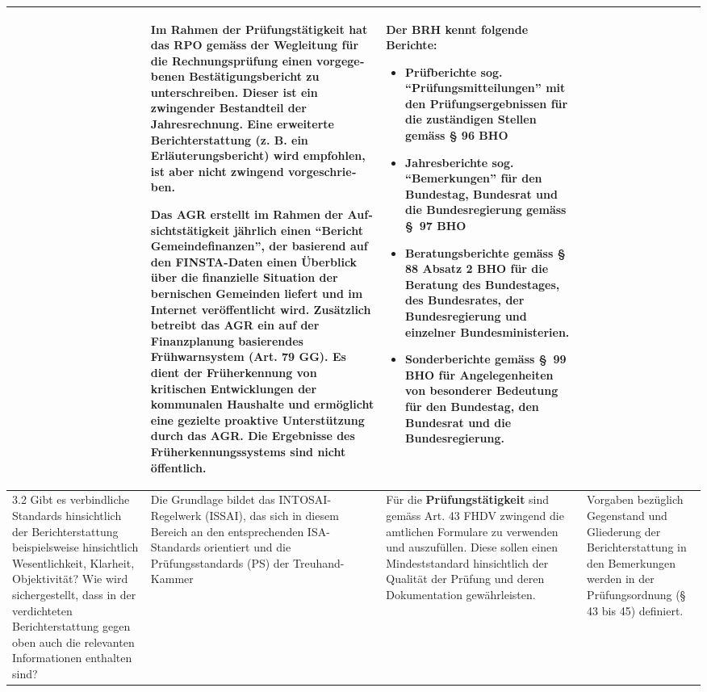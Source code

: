 \documentclass[10pt]{article}
\begin{document}
\begin{landscape}
\begin{center}
\begin{longtable}{|p{4cm}|p{5cm}|p{7.5cm}|p{7.5cm}|}
\begin{itemize}
\end{itemize}

 & Im Rahmen der \textbf{Prüfungstätigkeit} hat das RPO gemäss der Wegleitung für die Rechnungsprüfung einen vorgege­benen Bestätigungs­bericht zu unterschreiben. Dieser ist ein zwingender Bestandteil der Jahresrechnung. Eine erweiterte Berichterstattung (z. B. ein Erläuterungsbericht) wird empfohlen, ist aber nicht zwingend vorge­schrie­ben.

Das AGR erstellt im Rahmen der \textbf{Auf­sichts­tätigkeit} jährlich einen “{}Bericht Gemeindefinanzen”{}, der basierend auf den FINSTA-Daten einen Überblick über die finanzielle Situation der bernischen Gemeinden liefert und im Internet veröffentlicht wird. Zusätzlich betreibt das AGR ein auf der Finanzplanung basierendes Frühwarnsystem (Art. 79 GG). Es dient der Früherkennung von kritischen Entwicklungen der kommunalen Haushalte und ermöglicht eine gezielte proaktive Unterstützung durch das AGR. Die Ergebnisse des Früherkennungs­systems sind nicht öffentlich.

 & Der BRH kennt folgende Berichte:

\begin{itemize}
    \item Prüfberichte sog. “{}Prüfungsmitteilungen”{} mit den Prüfungs­ergebnissen für die zuständigen Stellen gemäss § 96 BHO

    \item Jahresberichte sog. “{}Bemerkungen”{} für den Bundestag, Bundesrat und die Bundesregierung gemäss §~97 BHO

    \item Beratungsberichte gemäss § 88 Absatz 2 BHO für die Beratung des Bundestages, des Bundesrates, der Bundesregierung und einzelner Bundes­ministerien.

    \item Sonder­berichte gemäss §~99 BHO für Angelegenheiten von besonderer Bedeutung für den Bundestag, den Bundesrat und die Bundesregierung.

\end{itemize}

 \\
\hline
3.2 Gibt es verbindliche Standards hinsichtlich der Berichterstattung beispielsweise hinsichtlich Wesentlichkeit, Klarheit, Objektivität? Wie wird sichergestellt, dass in der verdichteten Berichterstattung gegen oben auch die relevanten Informationen enthalten sind?  & Die Grundlage bildet das INTOSAI-Regelwerk (ISSAI), das sich in diesem Bereich an den entsprechenden ISA-Standards orientiert und die Prüfungsstandards (PS) der Treuhand-Kammer & Für die \textbf{Prüfungstätigkeit} sind gemäss Art. 43 FHDV zwingend die amtlichen Formulare zu verwenden und auszufüllen. Diese sollen einen Mindeststandard hinsichtlich der Qualität der Prüfung und deren Dokumentation gewährleisten. & Vorgaben bezüglich Gegenstand und Gliederung der Berichterstattung in den Bemerkungen werden in der Prüfungsordnung (§ 43 bis 45) definiert. 


\end{longtable}
\end{center}
\end{landscape}
\end{document}

